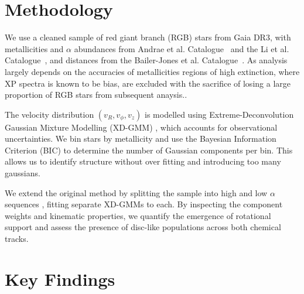 \documentclass[a4paper,10pt]{article}
\begin{document}
\begin{multicols}{2}
\section*{Methodology}

We use a cleaned sample of red giant branch (RGB) stars from Gaia DR3, with metallicities and $\alpha$ abundances from Andrae et 
al. Catalogue~\cite{Andrae2023} and the Li et al. Catalogue~\cite{Li2024}, and distances from the Bailer-Jones et al. 
Catalogue~\cite{BailerJones2021}. As analysis largely depends on the accuracies of metallicities regions of high extinction, 
where XP spectra is known to be bias, are excluded with the sacrifice of losing a large proportion of RGB stars from subsequent anaysis..

The velocity distribution $(v_R, v_\phi, v_z)$ is modelled using Extreme-Deconvolution Gaussian Mixture Modelling (XD-GMM) \cite{Bovy2011}\cite{pygmmis}, 
which accounts for observational uncertainties. We bin stars by metallicity and use the Bayesian Information Criterion (BIC) to determine the 
number of Gaussian components per bin. This allows us to identify structure without over fitting and introducing too many gaussians.


We extend the original method by splitting the sample into high and low $\alpha$ sequences \citep{Vis2024}, fitting separate 
XD-GMMs to each. By inspecting the component weights and kinematic properties, we quantify the emergence of rotational support 
and assess the presence of disc-like populations across both chemical tracks.

\section*{Key Findings}


\end{multicols}
\end{document}
